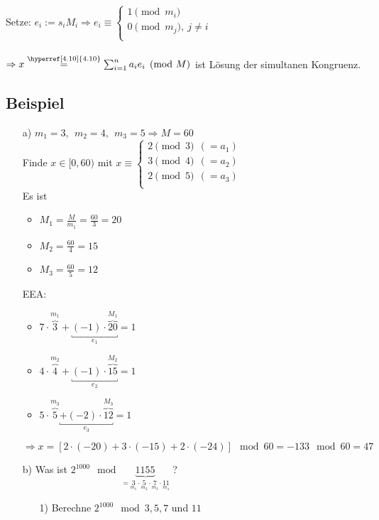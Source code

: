 \documentclass[12pt,titlepage, pdf]{article}
\renewcommand{\>}{\rightarrow}
\renewcommand{\*}{\cdot}
\begin{document}
Setze: $e_i := s_i M_i \Rightarrow e_i \equiv \begin{cases*}
1 \pmod{m_i} \\
0 \pmod{m_j},~ j \neq i\\
\end{cases*}$ \\
\\
$\Rightarrow x \overset{\textrm{\hyperref[4.10]{4.10}}}{=} \sum_{i = 1}^{n}a_i e_i \pmod{M} $ ist Lösung der simultanen Kongruenz.
\subsection{Beispiel}
\begin{itemize}
	\item[a)] $m_1 = 3, ~~m_2 = 4, ~~m_3 = 5 \Rightarrow M = 60$\\
	Finde $x \in [0,60)$ mit $x \equiv \begin{cases*}
	2 \pmod 3~~(=a_1)\\
	3 \pmod 4~~(=a_2)\\
	2 \pmod 5~~(=a_3)\\
	\end{cases*}$ \\
	Es ist 
	\begin{itemize}
		\item $M_1 = \frac{M}{m_1} = \frac{60}{3} = 20$ 
		\item  $M_2 = \frac{60}{4} = 15$
		\item $M_3 = \frac{60}{5} = 12$ 
	\end{itemize}
	EEA: 
	\begin{itemize}
		\item $7 \cdot \overbrace{3}^{m_1} + \underbracket{(-1) \cdot \overbrace{20}^{M_1}}_{e_1} = 1$
		\item $4 \cdot \overbrace{4}^{m_2} + \underbracket{(-1) \cdot \overbrace{15}^{M_2}}_{e_2} = 1$
		\item $5 \cdot \overbrace{5}^{m_3} \underbracket{+ (-2) \cdot \overbrace{12}^{M_3}}_{e_3} = 1$
	\end{itemize}
	$\Rightarrow x = [2 \cdot (-20) + 3 \cdot (-15) + 2 \cdot (-24)] \mod 60  =-133\mod 60= 47$
	\item[b)] Was ist $2^{1000} \mod \underbrace{1155}_{=\underset{m_1}{3} \cdot \underset{m_2}{5} \cdot \underset{m_3}{7} \cdot \underset{m_4}{11}}$ ?
	\begin{itemize}
		\item[1)] Berechne $2^{1000} \mod 3,5,7$ und $11$
		\begin{itemize}

\end{itemize}
\end{itemize}
\end{itemize}
\end{document}
